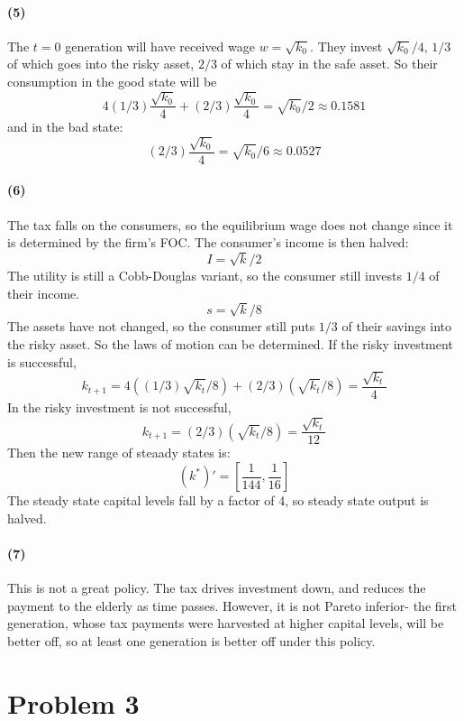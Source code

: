\documentclass[10pt,letter]{article}
\newcommand{\problem}[1]{\section*{Problem #1}}
\newcommand{\problempart}[1]{\paragraph{#1}}
\begin{document}
\problempart{(5)}
The $t=0$ generation will have received wage $w = \sqrt{k_0}$. They invest $\sqrt{k_0}/4$, $1/3$ of which goes into the risky asset, $2/3$ of which stay in the safe asset. So their consumption in the good state will be
\[ 4(1/3)\frac{\sqrt{k_0}}{4} + (2/3)\frac{\sqrt{k_0}}{4} = \sqrt{k_0}/2 \approx 0.1581 \]
and in the bad state:
\[ (2/3)\frac{\sqrt{k_0}}{4} = \sqrt{k_0}/6 \approx 0.0527 \]
\problempart{(6)}
The tax falls on the consumers, so the equilibrium wage does not change since it is determined by the firm's FOC. The consumer's income is then halved:
\[ I = \sqrt{k}/2 \]
The utility is still a Cobb-Douglas variant, so the consumer still invests $1/4$ of their income.
\[ s = \sqrt{k}/8 \]
The assets have not changed, so the consumer still puts $1/3$ of their savings into the risky asset. So the laws of motion can be determined.
If the risky investment is successful, \[ k_{t+1} = 4((1/3)\sqrt{k_t}/8) + (2/3) (\sqrt{k_t}/8) = \frac{\sqrt{k_t}}{4}  \]
In the risky investment is not successful, \[ k_{t+1} = (2/3) (\sqrt{k_t}/8) = \frac{\sqrt{k_t}}{12}  \]
Then the new range of steaady states is:
\[ (k^*)' = \left[\frac{1}{144}, \frac{1}{16} \right] \]
The steady state capital levels fall by a factor of 4, so steady state output is halved.
\problempart{(7)}
This is not a great policy. The tax drives investment down, and reduces the payment to the elderly as time passes. However, it is not Pareto inferior- the first generation, whose tax payments were harvested at higher capital levels, will be better off, so at least one generation is better off under this policy.
\pagebreak
\problem{3}
\end{document}
